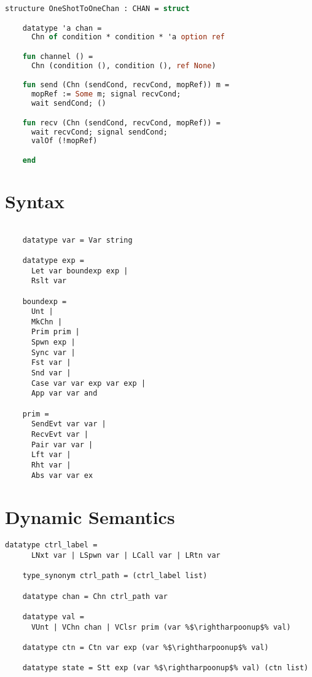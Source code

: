 \documentclass{article}
\begin{document}
\begin{lstlisting}[language=ML, style=codestyle1]
  structure OneShotToOneChan : CHAN = struct

    datatype 'a chan =
      Chn of condition * condition * 'a option ref

    fun channel () =
      Chn (condition (), condition (), ref None)

    fun send (Chn (sendCond, recvCond, mopRef)) m =
      mopRef := Some m; signal recvCond;  
      wait sendCond; ()

    fun recv (Chn (sendCond, recvCond, mopRef)) =
      wait recvCond; signal sendCond;
      valOf (!mopRef)

    end
  \end{lstlisting}


\section{Syntax}

  \begin{lstlisting}[style=codestyle1]

    datatype var = Var string

    datatype exp = 
      Let var boundexp exp |
      Rslt var

    boundexp =
      Unt |
      MkChn |
      Prim prim |
      Spwn exp |
      Sync var |
      Fst var |
      Snd var |
      Case var var exp var exp |
      App var var and

    prim = 
      SendEvt var var |
      RecvEvt var |
      Pair var var |
      Lft var |
      Rht var |
      Abs var var ex

  \end{lstlisting}



\section{Dynamic Semantics}


  \begin{lstlisting}[style=codestyle1, escapechar=\%]
    datatype ctrl_label = 
      LNxt var | LSpwn var | LCall var | LRtn var

    type_synonym ctrl_path = (ctrl_label list)

    datatype chan = Chn ctrl_path var

    datatype val = 
      VUnt | VChn chan | VClsr prim (var %$\rightharpoonup$% val)

    datatype ctn = Ctn var exp (var %$\rightharpoonup$% val)  

    datatype state = Stt exp (var %$\rightharpoonup$% val) (ctn list) 

    \end{lstlisting}
\end{document}
